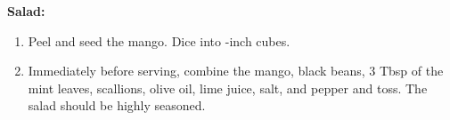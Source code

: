 \textbf{Salad:}

\begin{ingredients}
\end{ingredients}


\begin{recipe}
  \begin{enumerate}

  \item Peel and seed the mango.  Dice into \fracH-inch cubes.

  \item Immediately before serving, combine the mango, black beans, 3
    Tbsp of the mint leaves, scallions, olive oil, lime juice, salt,
    and pepper and toss.  The salad should be highly seasoned.

  \end{enumerate}
\end{recipe}


